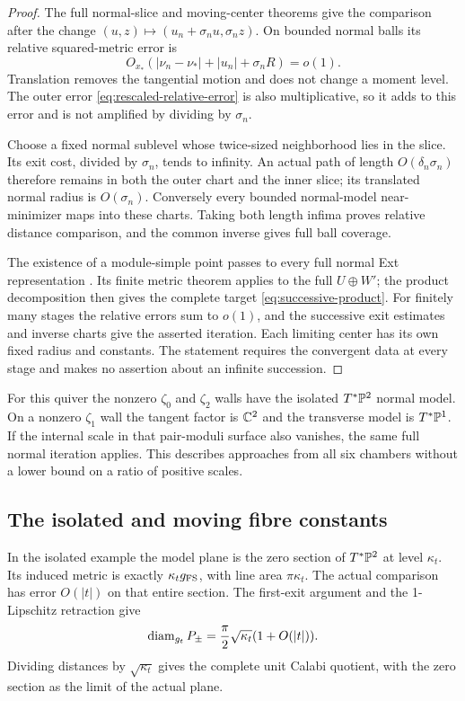 \begin{proof}
The full normal-slice and moving-center
theorems \cite[Sections~4 and~6]{wuebben14}
give the comparison after the change
$(u,z)\mapsto(u_n+\sigma_nu,\sigma_nz)$.
On bounded normal balls its relative
squared-metric error is
\begin{equation}\label{eq:successive-error}
 O_{x_*}(|\nu_n-\nu_*|+|u_n|+\sigma_n R)=o(1).
\end{equation}
Translation removes the tangential motion
and does not change a moment level. The
outer error \eqref{eq:rescaled-relative-error}
is also multiplicative, so it adds to this
error and is not amplified by dividing by
$\sigma_n$.

Choose a fixed normal sublevel whose twice-sized
neighborhood lies in the slice. Its exit cost,
divided by $\sigma_n$, tends to infinity.
An actual path of length $O(\delta_n\sigma_n)$
therefore remains in both the outer chart and
the inner slice; its translated normal radius
is $O(\sigma_n)$. Conversely every bounded
normal-model near-minimizer maps into these
charts. Taking both length infima proves
relative distance comparison, and the common
inverse gives full ball coverage.

The existence of a module-simple point passes
to every full normal Ext representation
\cite[Section~6]{wuebben14}. Its finite metric
theorem applies to the full $U\oplus W'$;
the product decomposition then gives the
complete target \eqref{eq:successive-product}.
For finitely many stages the relative errors
sum to $o(1)$, and the successive exit estimates
and inverse charts give the asserted iteration.
Each limiting center has its own fixed radius
and constants. The statement requires the
convergent data at every stage and makes no
assertion about an infinite succession.
\end{proof}

For this quiver the nonzero $\zeta_0$ and
$\zeta_2$ walls have the isolated
$T^*\mathbb P^2$ normal model. On a nonzero
$\zeta_1$ wall the tangent factor is $\mathbb C^2$
and the transverse model is $T^*\mathbb P^1$.
If the internal scale in that pair-moduli
surface also vanishes, the same full normal
iteration applies. This describes approaches
from all six chambers without a lower bound
on a ratio of positive scales.

\subsection{The isolated and moving fibre constants}
In the isolated example the model plane is
the zero section of $T^*\mathbb P^2$ at level
$\kappa_t$. Its induced metric is exactly
$\kappa_t g_{\rm FS}$, with line area $\pi\kappa_t$.
The actual comparison has error $O(|t|)$
on that entire section. The first-exit
argument and the 1-Lipschitz retraction give
\begin{equation}\label{eq:isolated-diameter}
 \operatorname{diam}_{g_t}P_\pm=\frac\pi2\sqrt{\kappa_t}
                       (1+O(|t|)).
\end{equation}
Dividing distances by $\sqrt{\kappa_t}$ gives
the complete unit Calabi quotient, with the
zero section as the limit of the actual plane.

